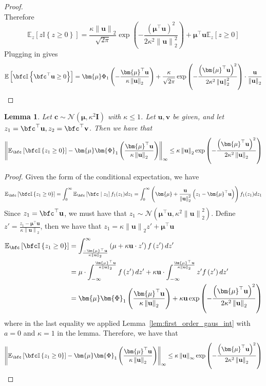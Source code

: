 \documentclass[10pt]{article} %
\newtheorem{lemma}[theorem]{Lemma}
\theoremstyle{definition}
\theoremstyle{plain}
\newcommand{\paren}[1]{\left(#1\right)}
\newcommand{\norm}[1]{\left\|#1\right\|}
\newcommand{\indy}[1]{\mathbb{I}\left\{#1\right\}}
\providecommand{\E}{\mathbb{E}}
\def\bfI{{\mathbf{I}}}\def\bfJ{{\mathbf{J}}}\def\bfK{{\mathbf{K}}}\def\bfL{{\mathbf{L}}}
\def\bfu{{\mathbf{u}}}\def\bfv{{\mathbf{v}}}\def\bfw{{\mathbf{w}}}\def\bfx{{\mathbf{x}}}
\begin{document}
\begin{proof}
\[    \]
    Therefore
    \[
        \E_z\left[z\indy{z\geq 0}\right] = \frac{\kappa\norm{\bfu}_2}{\sqrt{2\pi}}\exp\paren{-\frac{\paren{\bm{\mu}^\top\bfu}^2}{2\kappa^2\norm{\bfu}_2^2}} + \bm{\mu}^\top\bfu\E_z\left[z\geq 0\right]
    \]
    Plugging in gives
    \[
        \E\left[\bfc\indy{\bfc^\top\bfu\geq 0}\right] = \bm{\mu}\Phi_1\paren{-\frac{\bm{\mu}^\top\bfu}{\kappa\norm{\bfu}_2}} + \frac{\kappa}{\sqrt{2\pi}}\exp\paren{-\frac{\paren{\bm{\mu}^\top\bfu}^2}{2\kappa^2\norm{\bfu}_2^2}}\cdot\frac{\bfu}{\norm{\bfu}_2}
    \]
\end{proof}

\begin{lemma}
    \label{lem:exp_grad_2nd}
    Let $\bm{c}\sim\mathcal{N}\paren{\bm{\mu},\kappa^2\bfI}$ with $\kappa \leq 1$. Let $\bfu,\bfv$ be given, and let $z_1 = \bfc^\top\bfu, z_2 = \bfc^\top\bfv$. Then we have that
    \[
        \norm{\E_{\bfc}\left[\bfc\mathbb{I}\left\{z_1\geq 0\right\}\right] - \bm{\mu}\bm{\Phi}_1\paren{\frac{\bm{\mu}^\top\bfu}{\kappa\norm{\bfu}_2}}}_{\infty}\leq \kappa\norm{\bfu}_{2}\exp\paren{-\frac{\paren{\bm{\mu}^\top\bfu}^2}{2\kappa^2\norm{\bfu}_2}}
    \]
\end{lemma}
\begin{proof}
Given the form of the conditional expectation, we have
\[
    \E_{\bfc}\left[\bfc\mathbb{I}\left\{z_1\geq 0\right\}\right] = \int_0^\infty\E_{\bfc}\left[\bfc\mid z_1\right]f_1(z_1)dz_1 = \int_0^\infty\paren{\bm{\mu} + \frac{\bfu}{\norm{\bfu}_2^2}\paren{z_1 - \bm{\mu}^\top\bfu}}f_1(z_1)dz_1
\]
Since $z_1 = \bfc^\top\bfu$, we must have that $z_1\sim\mathcal{N}\paren{\bm{\mu}^\top\bfu,\kappa^2\norm{\bfu}_2^2}$. Define $z' = \frac{z_1 - \bm{\mu}^\top\bfu}{\kappa\norm{\bfu}_2}$, then we have that $z_1 = \kappa\norm{\bfu}_2z' + \bm{\mu}^\top\bfu$
\begin{align*}
    \E_{\bfc}\left[\bfc\mathbb{I}\left\{z_1\geq 0\right\}\right] & = \int_{\frac{- \bm{\mu}^\top\bfu}{\kappa\norm{\bfu}_2}}^{\infty}\paren{\mu+\kappa\bfu\cdot z'}f\paren{z'}dz'\\
    & = \mu\cdot \int_{-\infty}^{\frac{\bm{\mu}^\top\bfu}{\kappa\norm{\bfu}_2}}f\paren{z'}dz' + \kappa\bfu\cdot\int_{-\infty}^{\frac{\bm{\mu}^\top\bfu}{\kappa\norm{\bfu}_2}}z'f\paren{z'}dz'\\
    & = \bm{\mu}\bm{\Phi}_1\paren{\frac{\bm{\mu}^\top\bfu}{\kappa\norm{\bfu}_2}} + \kappa\bfu\exp\paren{-\frac{\paren{\bm{\mu}^\top\bfu}^2}{2\kappa^2\norm{\bfu}_2}}
\end{align*}
where in the last equality we applied Lemma~\ref{lem:first_order_gaus_int} with $a = 0$ and $\kappa = 1$ in the lemma. Therefore, we have that
\[
    \norm{\E_{\bfc}\left[\bfc\mathbb{I}\left\{z_1\geq 0\right\}\right] - \bm{\mu}\bm{\Phi}_1\paren{\frac{\bm{\mu}^\top\bfu}{\kappa\norm{\bfu}_2}}}_{\infty}\leq \kappa\norm{\bfu}_{\infty}\exp\paren{-\frac{\paren{\bm{\mu}^\top\bfu}^2}{2\kappa^2\norm{\bfu}_2}}
\]
\end{proof}
\end{document}
